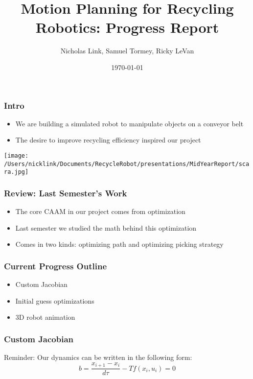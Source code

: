 \documentclass{beamer}
\title[Recycle Robot]{Motion Planning for Recycling Robotics: Progress Report} %
\author[Link, Tormey, LeVan]{Nicholas Link, Samuel Tormey, Ricky LeVan} %
\date{\today} %
\begin{document}
\begin{frame}
\titlepage %

\end{frame}

\begin{frame}
\frametitle{Intro}
\begin{itemize}
\item We are building a simulated robot to manipulate objects on a conveyor belt
\item The desire to improve recycling efficiency inspired our project
\end{itemize}
\begin{centering}
\texttt{[image: /Users/nicklink/Documents/RecycleRobot/presentations/MidYearReport/scara.jpg]}
\end{centering}

\end{frame}


\begin{frame}
\frametitle{Review: Last Semester's Work}
\begin{itemize}
\item The core CAAM in our project comes from optimization
\item Last semester we studied the math behind this optimization
\item Comes in two kinds: optimizing path and optimizing picking strategy
\end{itemize}


\end{frame}


\begin{frame}
\frametitle{Current Progress Outline}
\begin{itemize}
\item Custom Jacobian
\item Initial guess optimizations
\item 3D robot animation
\end{itemize}

\end{frame}

\begin{frame}
\frametitle{Custom Jacobian}
Reminder: Our dynamics can be written in the following form:
$$b = \frac{x_{i+1} - x_i}{d\tau} - Tf(x_i,u_i) = 0$$

\end{frame}
\end{document}
